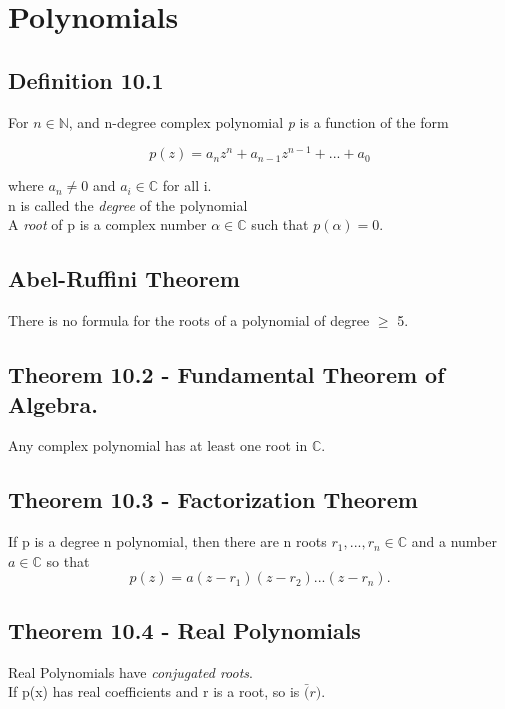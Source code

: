 \documentclass{article}
\begin{document}
\newpage
\section{Polynomials}
\subsection{Definition 10.1}
For $n\in \mathbb{N}$, and n-degree complex polynomial \emph{p} is a 
function of the form

\begin{equation}
    p(z)={a}_{n}z^{n} + {a}_{n-1}z^{n-1}+ ... + {a}_{0}
\end{equation}


where ${a}_{n} \neq 0$ and ${a}_{i} \in \mathbb{C}$ for all i.\\
    n is called the \emph{degree} of the polynomial \\
    A \emph{root} of p is a complex number $\alpha \in \mathbb{C}$ 
    such that $p(\alpha) = 0$.\\

\subsection{Abel-Ruffini Theorem}
There is no formula for the roots of a polynomial of degree $\geq$ 5.\\

\subsection{Theorem 10.2 - Fundamental Theorem of Algebra.}
Any complex polynomial has at least one root in $\mathbb{C}$.\\

\subsection{Theorem 10.3 - Factorization Theorem}
If p is a degree n polynomial, then there are n roots ${r}_{1},...,{r}_{n} \in \mathbb{C}$ 
and a number $a \in \mathbb{C}$ so that 
\begin{equation}
    p(z)=a(z-{r}_{1})(z-{r}_{2})...(z-{r}_{n}).
\end{equation}

\subsection{Theorem 10.4 - Real Polynomials}
Real Polynomials have \emph{conjugated roots}. \\
If p(x) has real coefficients and r is a root, so is $\bar(r)$.
\end{document}
